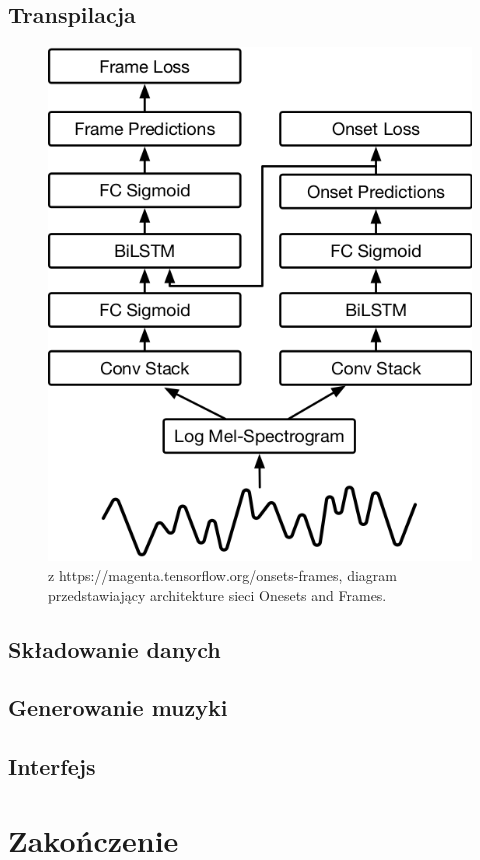 \documentclass[12pt,a4paper,twoside]{mwart}
\begin{document}
\subsection{Transpilacja}
\begin{figure}[H]
  \begin{center}
    \includegraphics[scale=0.8]{images/architekturaSieciOnesetsFrames.png}
    \caption{z https://magenta.tensorflow.org/onsets-frames, diagram przedstawiający architekture sieci Onesets and Frames.}
  \end{center}
\end{figure}
\cite{DBLP:journals/corr/LuongPM15}
\newpage

\subsection{Składowanie danych}
\newpage

\subsection{Generowanie muzyki}
\newpage
\subsection{Interfejs}
\cite{reactWDzialaniu}\cite{tsDocumentation}
\newpage
\section{Zakończenie}
\newpage


\printbibliography
\end{document}

